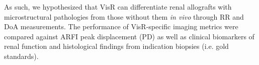 As such, we hypothesized that VisR can differentiate renal allografts with microstructural pathologies from those without them \emph{in vivo} through RR and DoA measurements. The performance of VisR-specific imaging metrics were compared against ARFI peak displacement (PD) as well as clinical biomarkers of renal function and histological findings from indication biopsies (i.e. gold standards).
